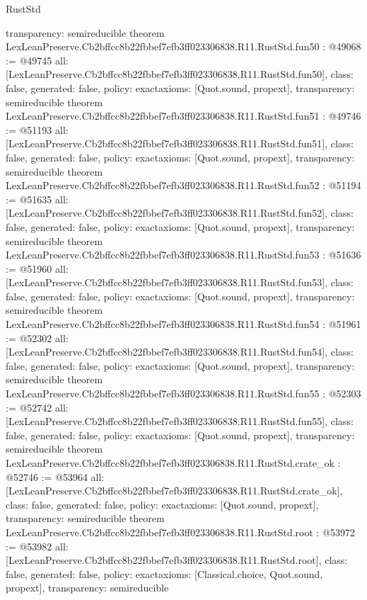 \begin{lexlean}{RustStd}
\begin{coremodule}
{  transparency: semireducible
}
theorem LexLeanPreserve.Cb2bffcc8b22fbbef7efb3ff023306838.R11.RustStd.fun50 : @49068 := @49745 {
  all: [LexLeanPreserve.Cb2bffcc8b22fbbef7efb3ff023306838.R11.RustStd.fun50],
  class: false,
  generated: false,
  policy: exact{axioms: [Quot.sound, propext]},
  transparency: semireducible
}
theorem LexLeanPreserve.Cb2bffcc8b22fbbef7efb3ff023306838.R11.RustStd.fun51 : @49746 := @51193 {
  all: [LexLeanPreserve.Cb2bffcc8b22fbbef7efb3ff023306838.R11.RustStd.fun51],
  class: false,
  generated: false,
  policy: exact{axioms: [Quot.sound, propext]},
  transparency: semireducible
}
theorem LexLeanPreserve.Cb2bffcc8b22fbbef7efb3ff023306838.R11.RustStd.fun52 : @51194 := @51635 {
  all: [LexLeanPreserve.Cb2bffcc8b22fbbef7efb3ff023306838.R11.RustStd.fun52],
  class: false,
  generated: false,
  policy: exact{axioms: [Quot.sound, propext]},
  transparency: semireducible
}
theorem LexLeanPreserve.Cb2bffcc8b22fbbef7efb3ff023306838.R11.RustStd.fun53 : @51636 := @51960 {
  all: [LexLeanPreserve.Cb2bffcc8b22fbbef7efb3ff023306838.R11.RustStd.fun53],
  class: false,
  generated: false,
  policy: exact{axioms: [Quot.sound, propext]},
  transparency: semireducible
}
theorem LexLeanPreserve.Cb2bffcc8b22fbbef7efb3ff023306838.R11.RustStd.fun54 : @51961 := @52302 {
  all: [LexLeanPreserve.Cb2bffcc8b22fbbef7efb3ff023306838.R11.RustStd.fun54],
  class: false,
  generated: false,
  policy: exact{axioms: [Quot.sound, propext]},
  transparency: semireducible
}
theorem LexLeanPreserve.Cb2bffcc8b22fbbef7efb3ff023306838.R11.RustStd.fun55 : @52303 := @52742 {
  all: [LexLeanPreserve.Cb2bffcc8b22fbbef7efb3ff023306838.R11.RustStd.fun55],
  class: false,
  generated: false,
  policy: exact{axioms: [Quot.sound, propext]},
  transparency: semireducible
}
theorem LexLeanPreserve.Cb2bffcc8b22fbbef7efb3ff023306838.R11.RustStd.crate_ok : @52746 := @53964 {
  all: [LexLeanPreserve.Cb2bffcc8b22fbbef7efb3ff023306838.R11.RustStd.crate_ok],
  class: false,
  generated: false,
  policy: exact{axioms: [Quot.sound, propext]},
  transparency: semireducible
}
theorem LexLeanPreserve.Cb2bffcc8b22fbbef7efb3ff023306838.R11.RustStd.root : @53972 := @53982 {
  all: [LexLeanPreserve.Cb2bffcc8b22fbbef7efb3ff023306838.R11.RustStd.root],
  class: false,
  generated: false,
  policy: exact{axioms: [Classical.choice, Quot.sound, propext]},
  transparency: semireducible
}


\end{coremodule}
\end{lexlean}
